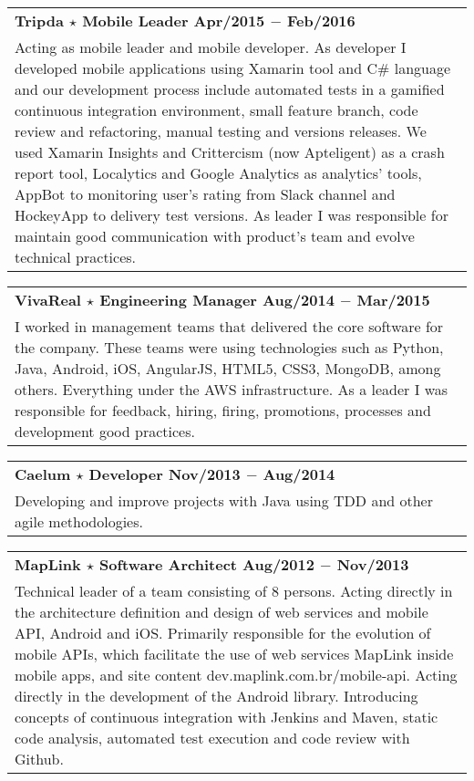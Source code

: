 \documentclass[a4paper, oneside, final]{scrartcl}
\newcommand{\vspc}{\vspace{0.15cm}} %
\begin{document}
\begin{center}
\begin{tabularx}{1\linewidth}{X}
{\bf Tripda $\star$ Mobile Leader \hfill Apr/2015 $-$ Feb/2016} \\
Acting as mobile leader and mobile developer. As developer I developed mobile applications using Xamarin tool and C\# language and our development process include automated tests in a gamified continuous integration environment, small feature branch, code review and refactoring, manual testing and versions releases. We used Xamarin Insights and Crittercism (now Apteligent) as a crash report tool, Localytics and Google Analytics as analytics' tools, AppBot to monitoring user's rating from Slack channel and HockeyApp to delivery test versions. As leader I was responsible for maintain good communication with product's team and evolve technical practices. \vspc\\
\end{tabularx}

\begin{tabularx}{1\linewidth}{X}
{\bf VivaReal $\star$ Engineering Manager \hfill Aug/2014 $-$ Mar/2015} \\
I worked in management teams that delivered the core software for the company. These teams were using technologies such as Python, Java, Android, iOS, AngularJS, HTML5, CSS3, MongoDB, among others. Everything under the AWS infrastructure. As a leader I was responsible for feedback, hiring, firing, promotions, processes and development good practices. \vspc\\
\end{tabularx}

\begin{tabularx}{1\linewidth}{X}
{\bf Caelum $\star$ Developer \hfill Nov/2013 $-$ Aug/2014} \\
Developing and improve projects with Java using TDD and other agile methodologies. \vspc\\
\end{tabularx}

\begin{tabularx}{1\linewidth}{X}
{\bf MapLink $\star$ Software Architect \hfill Aug/2012 $-$ Nov/2013} \\
Technical leader of a team consisting of 8 persons. Acting directly in the architecture definition and design of web services and mobile API, Android and iOS. Primarily responsible for the evolution of mobile APIs, which facilitate the use of web services MapLink inside mobile apps, and site content dev.maplink.com.br/mobile-api. Acting directly in the development of the Android library. Introducing concepts of continuous integration with Jenkins and Maven, static code analysis, automated test execution and code review with Github. \vspc\\
\end{tabularx}


\end{center}
\end{document}
